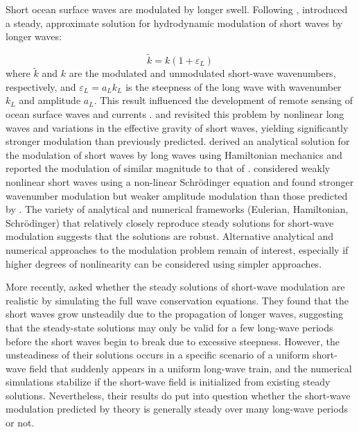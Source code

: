 \documentclass[lineno]{jfm}
\begin{document}
Short ocean surface waves are modulated by longer swell.
Following \citet{unna1941white,unna1942waves,unna1947sea},
\citet{longuet1960changes} introduced a steady, approximate solution for
hydrodynamic modulation of short waves by longer waves:

\begin{equation}
\label{eq:lhs1960wavenumber}
\widetilde{k} = k (1 + \varepsilon_L)
\end{equation}
where $\widetilde{k}$ and $k$ are the modulated and unmodulated short-wave wavenumbers,
respectively, and $\varepsilon_L = a_L k_L$ is the steepness of the long wave with
wavenumber $k_L$ and amplitude $a_L$.
This result influenced the development of remote sensing of ocean
surface waves and currents \citep{keller1975microwave,hara1994hydrodynamic}.
\citet{phillips1981dispersion} and \citet{longuet1987propagation} revisited this
problem by nonlinear long waves and variations in the effective gravity of short
waves, yielding significantly stronger modulation than previously predicted.
\citet{henyey1988energy} derived an analytical solution for the modulation of
short waves by long waves using Hamiltonian mechanics and reported the modulation
of similar magnitude to that of \citet{longuet1987propagation}.
\citet{zhang1990evolution} considered weakly nonlinear short waves
using a non-linear Schr\" odinger equation and found stronger wavenumber
modulation but weaker amplitude modulation than those predicted by
\citet{longuet1987propagation}.
The variety of analytical and numerical frameworks (Eulerian, Hamiltonian,
Schr\" odinger) that relatively closely reproduce steady solutions for short-wave
modulation suggests that the solutions are robust.
Alternative analytical and numerical approaches to the modulation problem remain
of interest, especially if higher degrees of nonlinearity can be considered
using simpler approaches.

More recently, \citep{peureux2021unsteady} asked whether the steady solutions
of short-wave modulation are realistic by simulating the full wave conservation
equations.
They found that the short waves grow unsteadily due to the propagation of
longer waves, suggesting that the steady-state solutions may only be valid for
a few long-wave periods before the short waves begin to break due to excessive
steepness.
However, the unsteadiness of their solutions occurs in a specific scenario of
a uniform short-wave field that suddenly appears in a uniform long-wave train,
and the numerical simulations stabilize if the short-wave field is initialized
from existing steady solutions.
Nevertheless, their results do put into question whether the short-wave
modulation predicted by theory is generally steady over many long-wave periods
or not.
\end{document}
